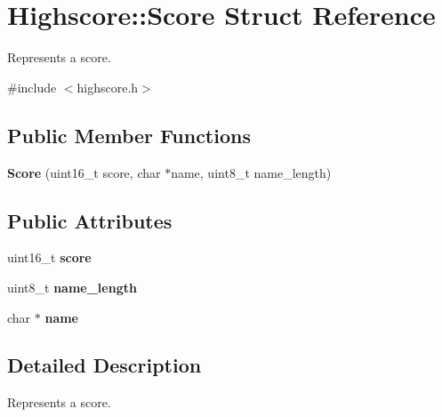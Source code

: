 \hypertarget{struct_highscore_1_1_score}{\section{Highscore\-:\-:Score Struct Reference}
\label{struct_highscore_1_1_score}
}


Represents a score.  




{\ttfamily \#include $<$highscore.\-h$>$}

\subsection*{Public Member Functions}
\begin{DoxyCompactItemize}
\item 
\hypertarget{struct_highscore_1_1_score_a12b53d0585857767f7b672a7ca6d6bcd}{{\bfseries Score} (uint16\-\_\-t score, char $\ast$name, uint8\-\_\-t name\-\_\-length)}\label{struct_highscore_1_1_score_a12b53d0585857767f7b672a7ca6d6bcd}

\end{DoxyCompactItemize}
\subsection*{Public Attributes}
\begin{DoxyCompactItemize}
\item 
\hypertarget{struct_highscore_1_1_score_adb7302dea6fad5c7420f7df730829df6}{uint16\-\_\-t {\bfseries score}}\label{struct_highscore_1_1_score_adb7302dea6fad5c7420f7df730829df6}

\item 
\hypertarget{struct_highscore_1_1_score_a078c44b0290200e5f94d80bf2d21fec1}{uint8\-\_\-t {\bfseries name\-\_\-length}}\label{struct_highscore_1_1_score_a078c44b0290200e5f94d80bf2d21fec1}

\item 
\hypertarget{struct_highscore_1_1_score_aee466300716e218f0ebb6c695a7e52ca}{char $\ast$ {\bfseries name}}\label{struct_highscore_1_1_score_aee466300716e218f0ebb6c695a7e52ca}

\end{DoxyCompactItemize}


\subsection{Detailed Description}
Represents a score. 


